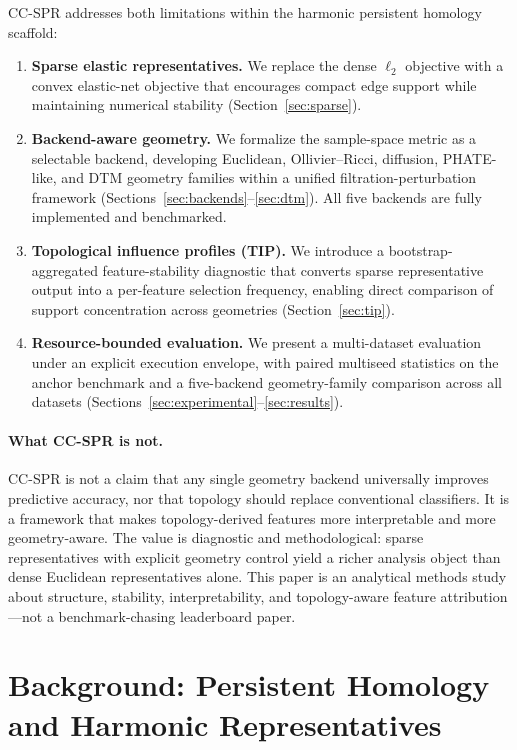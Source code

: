 \documentclass[11pt]{article}
\begin{document}
CC-SPR addresses both limitations within the harmonic persistent homology scaffold:
\begin{enumerate}[leftmargin=1.5em]
\item \textbf{Sparse elastic representatives.} We replace the dense $\ell_2$ objective with a convex elastic-net objective that encourages compact edge support while maintaining numerical stability (Section~\ref{sec:sparse}).
\item \textbf{Backend-aware geometry.} We formalize the sample-space metric as a selectable backend, developing Euclidean, Ollivier--Ricci, diffusion, PHATE-like, and DTM geometry families within a unified filtration-perturbation framework (Sections~\ref{sec:backends}--\ref{sec:dtm}).
All five backends are fully implemented and benchmarked.
\item \textbf{Topological influence profiles (TIP).} We introduce a bootstrap-aggregated feature-stability diagnostic that converts sparse representative output into a per-feature selection frequency, enabling direct comparison of support concentration across geometries (Section~\ref{sec:tip}).
\item \textbf{Resource-bounded evaluation.} We present a multi-dataset evaluation under an explicit execution envelope, with paired multiseed statistics on the anchor benchmark and a five-backend geometry-family comparison across all datasets (Sections~\ref{sec:experimental}--\ref{sec:results}).
\end{enumerate}

\paragraph{What CC-SPR is not.}
CC-SPR is not a claim that any single geometry backend universally improves predictive accuracy, nor that topology should replace conventional classifiers.
It is a framework that makes topology-derived features more interpretable and more geometry-aware.
The value is diagnostic and methodological: sparse representatives with explicit geometry control yield a richer analysis object than dense Euclidean representatives alone.
This paper is an analytical methods study about structure, stability, interpretability, and topology-aware feature attribution---not a benchmark-chasing leaderboard paper.

\section{Background: Persistent Homology and Harmonic Representatives}
\label{sec:background}
\end{document}
